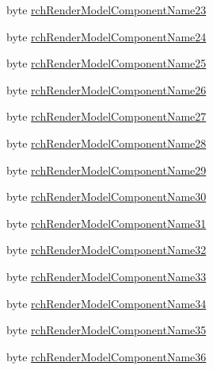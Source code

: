 \begin{DoxyCompactItemize}
\item 
byte \mbox{\hyperlink{struct_valve_1_1_v_r_1_1_input_origin_info__t_a29ef2f689a777dd99323d67f66d5214b}{rch\+Render\+Model\+Component\+Name23}}
\item 
byte \mbox{\hyperlink{struct_valve_1_1_v_r_1_1_input_origin_info__t_a6a29865b85bd27777e790259e7925b3c}{rch\+Render\+Model\+Component\+Name24}}
\item 
byte \mbox{\hyperlink{struct_valve_1_1_v_r_1_1_input_origin_info__t_a8d9cb334ec686620b789029a76ed4886}{rch\+Render\+Model\+Component\+Name25}}
\item 
byte \mbox{\hyperlink{struct_valve_1_1_v_r_1_1_input_origin_info__t_a4fff3032e294267fefd9ed893433a176}{rch\+Render\+Model\+Component\+Name26}}
\item 
byte \mbox{\hyperlink{struct_valve_1_1_v_r_1_1_input_origin_info__t_a3a0d412455d05f65e17568dc1cab6624}{rch\+Render\+Model\+Component\+Name27}}
\item 
byte \mbox{\hyperlink{struct_valve_1_1_v_r_1_1_input_origin_info__t_ad9a5a73890603de2da8d24b30ee1934c}{rch\+Render\+Model\+Component\+Name28}}
\item 
byte \mbox{\hyperlink{struct_valve_1_1_v_r_1_1_input_origin_info__t_a5d6fbddba1b0aebe0cbea5408b68b36f}{rch\+Render\+Model\+Component\+Name29}}
\item 
byte \mbox{\hyperlink{struct_valve_1_1_v_r_1_1_input_origin_info__t_a9e78dc393c81d67f61ff05a1799e3398}{rch\+Render\+Model\+Component\+Name30}}
\item 
byte \mbox{\hyperlink{struct_valve_1_1_v_r_1_1_input_origin_info__t_ae7af1f592420b15891e301f83fd9243f}{rch\+Render\+Model\+Component\+Name31}}
\item 
byte \mbox{\hyperlink{struct_valve_1_1_v_r_1_1_input_origin_info__t_a16d7c2e0a7eeef93f72b9527ef65866f}{rch\+Render\+Model\+Component\+Name32}}
\item 
byte \mbox{\hyperlink{struct_valve_1_1_v_r_1_1_input_origin_info__t_ad9918078f57a01875d2d145a348d78af}{rch\+Render\+Model\+Component\+Name33}}
\item 
byte \mbox{\hyperlink{struct_valve_1_1_v_r_1_1_input_origin_info__t_a3ad9ef3c9e9f11d1d2d9992154419669}{rch\+Render\+Model\+Component\+Name34}}
\item 
byte \mbox{\hyperlink{struct_valve_1_1_v_r_1_1_input_origin_info__t_aca89d6b9323c38fc1999f7f4dcb6fdfb}{rch\+Render\+Model\+Component\+Name35}}
\item 
byte \mbox{\hyperlink{struct_valve_1_1_v_r_1_1_input_origin_info__t_a09d69dae6b4bb416eae7da1d650c7549}{rch\+Render\+Model\+Component\+Name36}}

\end{DoxyCompactItemize}
